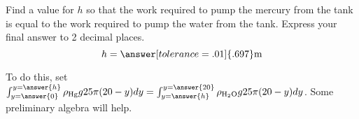 \documentclass{ximera}
\begin{document}
\begin{exercise}
Find a value for $h$ so that the work required to pump the mercury from the tank is equal to the work required to pump the water from the tank.  Express your final answer to 2 decimal places.
\[
h=\answer[tolerance=.01]{.697} \text{m}
\]

\begin{hint}
To do this, set $\int_{y=\answer{0}}^{y=\answer{h}} \rho_{\text{Hg}} g 25 \pi (20-y) dy = \int_{y=\answer{h}}^{y=\answer{20}} \rho_{\text{H$_2$O}} g 25 \pi (20-y) dy$.  Some preliminary algebra will help.
\end{hint}
\end{exercise}
\end{document}
